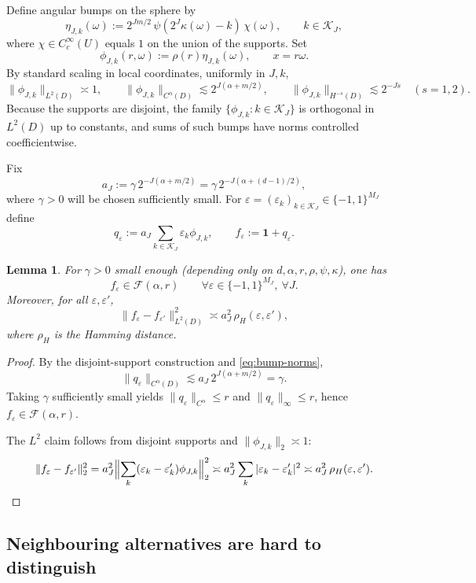 \documentclass[11pt]{article}
\newtheorem{lemma}[theorem]{Lemma}
\newcommand{\one}{\mathbf 1}
\begin{document}
Define angular bumps on the sphere by
\[
\eta_{J,k}(\omega):=
2^{Jm/2}\,\psi(2^J\kappa(\omega)-k)\,\chi(\omega),
\qquad k\in\mathcal K_J,
\]
where $\chi\in C_c^\infty(U)$ equals $1$ on the union of the supports. Set
\[
\phi_{J,k}(r,\omega):=\rho(r)\eta_{J,k}(\omega),\qquad x=r\omega.
\]
By standard scaling in local coordinates, uniformly in $J,k$,
\begin{equation}\label{eq:bump-norms}
\|\phi_{J,k}\|_{L^2(D)}\asymp 1,
\qquad
\|\phi_{J,k}\|_{C^\alpha(D)}\lesssim 2^{J(\alpha+m/2)},
\qquad
\|\phi_{J,k}\|_{H^{-s}(D)}\lesssim 2^{-Js}\quad (s=1,2).
\end{equation}
Because the supports are disjoint, the family $\{\phi_{J,k}:k\in\mathcal K_J\}$ is orthogonal in $L^2(D)$ up to constants, and sums of such bumps have norms controlled coefficientwise.

Fix
\[
a_J:=\gamma\, 2^{-J(\alpha+m/2)}
=\gamma\, 2^{-J(\alpha+(d-1)/2)},
\]
where $\gamma>0$ will be chosen sufficiently small. For $\varepsilon=(\varepsilon_k)_{k\in\mathcal K_J}\in\{-1,1\}^{M_J}$ define
\[
q_\varepsilon:=a_J\sum_{k\in\mathcal K_J}\varepsilon_k\phi_{J,k},
\qquad
f_\varepsilon:=\one+q_\varepsilon.
\]

\begin{lemma}\label{lem:family}
For $\gamma>0$ small enough (depending only on $d,\alpha,r,\rho,\psi,\kappa$), one has
\[
f_\varepsilon\in \mathcal F(\alpha,r)\qquad \forall \varepsilon\in\{-1,1\}^{M_J},\ \forall J.
\]
Moreover, for all $\varepsilon,\varepsilon'$,
\[
\|f_\varepsilon-f_{\varepsilon'}\|_{L^2(D)}^2
\asymp
a_J^2\, \rho_H(\varepsilon,\varepsilon'),
\]
where $\rho_H$ is the Hamming distance.
\end{lemma}

\begin{proof}
By the disjoint-support construction and \eqref{eq:bump-norms},
\[
\|q_\varepsilon\|_{C^\alpha(D)}
\lesssim
a_J\, 2^{J(\alpha+m/2)}
=
\gamma.
\]
Taking $\gamma$ sufficiently small yields $\|q_\varepsilon\|_{C^\alpha}\le r$ and $\|q_\varepsilon\|_\infty\le r$, hence $f_\varepsilon\in \mathcal F(\alpha,r)$.

The $L^2$ claim follows from disjoint supports and $\|\phi_{J,k}\|_2\asymp 1$:
\[
\|f_\varepsilon-f_{\varepsilon'}\|_2^2
=
a_J^2\Bigl\|\sum_k (\varepsilon_k-\varepsilon_k')\phi_{J,k}\Bigr\|_2^2
\asymp
a_J^2 \sum_k |\varepsilon_k-\varepsilon_k'|^2
\asymp
a_J^2\, \rho_H(\varepsilon,\varepsilon').
\]
\end{proof}

\subsection*{Neighbouring alternatives are hard to distinguish}
\end{document}
